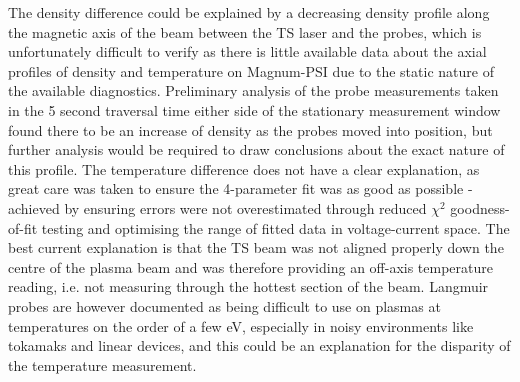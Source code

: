 \documentclass[a4paper, 12pt]{article} %
\begin{document}
	The density difference could be explained by a decreasing density profile along the magnetic axis of the beam between the TS laser and the probes, which is unfortunately difficult to verify as there is little available data about the axial profiles of density and temperature on Magnum-PSI due to the static nature of the available diagnostics.
	Preliminary analysis of the probe measurements taken in the 5 second traversal time either side of the stationary measurement window found there to be an increase of density as the probes moved into position, but further analysis would be required to draw conclusions about the exact nature of this profile.
	The temperature difference does not have a clear explanation, as great care was taken to ensure the 4-parameter fit was as good as possible - achieved by ensuring errors were not overestimated through reduced $\chi^2$ goodness-of-fit testing and optimising the range of fitted data in voltage-current space.
	The best current explanation is that the TS beam was not aligned properly down the centre of the plasma beam and was therefore providing an off-axis temperature reading, i.e. not measuring through the hottest section of the beam.
	Langmuir probes are however documented as being difficult to use on plasmas at temperatures on the order of a few eV\cite{Stangeby2000}, especially in noisy environments like tokamaks and linear devices, and this could be an explanation for the disparity of the temperature measurement.
	
\end{document}
